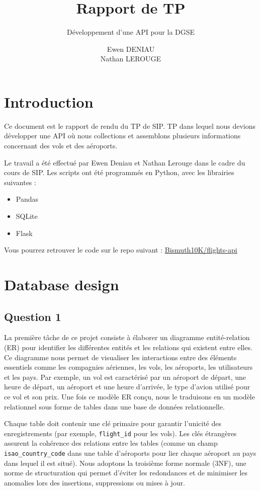 \documentclass{ceri/sty/rapport}
\title{Rapport de TP}
\subtitle{Développement d'une API pour la DGSE} %
\author{
Ewen DENIAU\\
Nathan LEROUGE
}
\begin{document}
 

\maketitle

\sloppy      

\section{Introduction}
Ce document est le rapport de rendu du TP de SIP.
TP dans lequel nous devions développer une API où nous collections et assemblons plusieurs informations concernant des vols et des aéroports.

Le travail a été effectué par Ewen Deniau et Nathan Lerouge dans le cadre du cours de SIP.
Les scripts ont été programmés en Python, avec les librairies suivantes :
\begin{itemize}
    \item Pandas
    \item SQLite
    \item Flask
\end{itemize}

Vous pourrez retrouver le code sur le repo suivant : \href{https://github.com/Bismuth10K/flights-api}{Bismuth10K/flights-api}

\section{Database design}
\subsection{Question 1}
La première tâche de ce projet consiste à élaborer un diagramme entité-relation (ER) pour identifier les différentes entités et les relations qui existent entre elles. Ce diagramme nous permet de visualiser les interactions entre des éléments essentiels comme les compagnies aériennes, les vols, les aéroports, les utilisateurs et les pays. Par exemple, un vol est caractérisé par un aéroport de départ, une heure de départ, un aéroport et une heure d'arrivée, le type d'avion utilisé pour ce vol et son prix. Une fois ce modèle ER conçu, nous le traduisons en un modèle relationnel sous forme de tables dans une base de données relationnelle.

Chaque table doit contenir une clé primaire pour garantir l'unicité des enregistrements (par exemple, \texttt{flight\_id} pour les vols).
Les clés étrangères assurent la cohérence des relations entre les tables (comme un champ \texttt{isao\_country\_code} dans une table d'aéroports pour lier chaque aéroport au pays dans lequel il est situé).
Nous adoptons la troisième forme normale (3NF), une norme de structuration qui permet d'éviter les redondances et de minimiser les anomalies lors des insertions, suppressions ou mises à jour.
\end{document}
